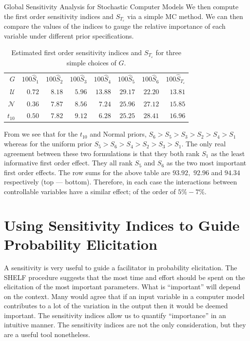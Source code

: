 \begin{chapter}{Global Sensitivity Analysis for Stochastic Computer Models}
We then compute the first order sensitivity indices and $S_{T_\varepsilon}$ via a simple MC method. We can then compare the values of the indices to gauge the relative importance of each variable under different prior specifications.

\begin{table}[ht]
\centering
\begin{tabular}{rrrrrrrr}
  \toprule
 $G$ & $100\hat{S}_1$ & $100\hat{S}_2$ & $100\hat{S}_3$ & $100\hat{S}_4$ & $100\hat{S}_5$ & $100\hat{S}_6$ & $100\hat{S}_{T_\varepsilon}$\\ 
  \cmidrule{1-8}
$\mathcal{U}$ & $0.72$ & $8.18$ & $5.96$ & $13.88$ & $29.17$ & $22.20$ & $13.81$\\ 
  $\mathcal{N}$ & $0.36$ & $7.87$ & $8.56$ & $7.24$ & $25.96$ & $27.12$ & $15.85$\\ 
  $t_{10}$ & $0.50$ & $7.82$ & $9.12$ & $6.28$ & $25.25$ & $28.41$ & $16.96$\\ 
   \bottomrule
\end{tabular}
\caption{Estimated first order sensitivity indices and $S_{T_\varepsilon}$ for three simple choices of $G$.}
\label{Tab:sa-sensitivity}
\end{table}


From  we see that for the $t_{10}$ and Normal priors, $S_6 >  S_5 > S_3 > S_2 > S_4 > S_1$ whereas for the uniform prior $S_5 > S_6 > S_4 > S_2 > S_3 > S_1$. The only real agreement between these two formulations is that they both rank $S_1$ as the least informative first order effect. They all rank $S_5$ and $S_6$ as the two most important first order effects. The row sums for the above table are $93.92,$ $92.96$ and $94.34$ respectively (top --- bottom). Therefore, in each case the interactions between controllable variables have a similar effect; of the order of $5\% - 7\%$.

\section{Using Sensitivity Indices to Guide Probability Elicitation}

A sensitivity is very useful to guide a facilitator in probability elicitation. The SHELF procedure \citep{SHELF4} suggests that the most time and effort should be spent on the elicitation of the most important parameters. What is ``important'' will depend on the context. Many would agree that if an input variable in a computer model contributes to a lot of the variation in the output then it would be deemed important. The sensitivity indices allow us to quantify ``importance'' in an intuitive manner. The sensitivity indices are not the only consideration, but they are  a useful tool nonetheless.\\


\end{chapter}
